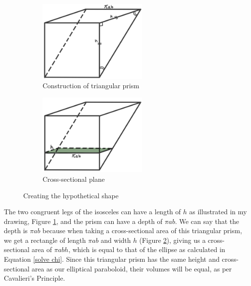 \documentclass[12pt]{article}
\begin{document}
\begin{figure}[h]
     \centering
     \begin{subfigure}[b]{0.45\textwidth}
         \centering
         \includegraphics[width=0.6\textwidth]{images/tria.jpg}
         \caption{Construction of triangular prism}
         \label{fig:full trig}
     \end{subfigure}
     \hfill
     \begin{subfigure}[b]{0.45\textwidth}
         \centering
         \includegraphics[width=0.6\textwidth]{images/tria cross.jpg}
         \caption{Cross-sectional plane}
         \label{fig:cross trig}
     \end{subfigure}
     \hfill
        \caption{Creating the hypothetical shape}
        \label{fig:axes}
\end{figure}

The two congruent legs of the isosceles can have a length of $h$ as illustrated in my drawing, Figure \ref{fig:full trig}, and the prism can have a depth of $\pi a b$. We can say that the depth is $\pi ab$ because when taking a cross-sectional area of this triangular prism, we get a rectangle of length $\pi ab$ and width $h$ (Figure \ref{fig:cross trig}), giving us a cross-sectional area of $\pi ab h$, which is equal to that of the ellipse as calculated in Equation \ref{solve chi}. Since this triangular prism has the same height and cross-sectional area as our elliptical paraboloid, their volumes will be equal, as per Cavalieri's Principle.
\end{document}

